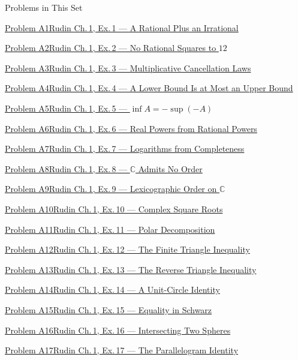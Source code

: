 \documentclass[main.tex]{subfiles}
\begin{document}
\hypertarget{hw-1}{}

\begin{lecturecontents}{Problems in This Set}
  \item \hyperlink{prob:A1}{Problem A1\quad Rudin Ch.\,1, Ex.\,1 --- A Rational Plus an Irrational}
  \item \hyperlink{prob:A2}{Problem A2\quad Rudin Ch.\,1, Ex.\,2 --- No Rational Squares to $12$}
  \item \hyperlink{prob:A3}{Problem A3\quad Rudin Ch.\,1, Ex.\,3 --- Multiplicative Cancellation Laws}
  \item \hyperlink{prob:A4}{Problem A4\quad Rudin Ch.\,1, Ex.\,4 --- A Lower Bound Is at Most an Upper Bound}
  \item \hyperlink{prob:A5}{Problem A5\quad Rudin Ch.\,1, Ex.\,5 --- $\inf A=-\sup(-A)$}
  \item \hyperlink{prob:A6}{Problem A6\quad Rudin Ch.\,1, Ex.\,6 --- Real Powers from Rational Powers}
  \item \hyperlink{prob:A7}{Problem A7\quad Rudin Ch.\,1, Ex.\,7 --- Logarithms from Completeness}
  \item \hyperlink{prob:A8}{Problem A8\quad Rudin Ch.\,1, Ex.\,8 --- $\mathbb C$ Admits No Order}
  \item \hyperlink{prob:A9}{Problem A9\quad Rudin Ch.\,1, Ex.\,9 --- Lexicographic Order on $\mathbb C$}
  \item \hyperlink{prob:A10}{Problem A10\quad Rudin Ch.\,1, Ex.\,10 --- Complex Square Roots}
  \item \hyperlink{prob:A11}{Problem A11\quad Rudin Ch.\,1, Ex.\,11 --- Polar Decomposition}
  \item \hyperlink{prob:A12}{Problem A12\quad Rudin Ch.\,1, Ex.\,12 --- The Finite Triangle Inequality}
  \item \hyperlink{prob:A13}{Problem A13\quad Rudin Ch.\,1, Ex.\,13 --- The Reverse Triangle Inequality}
  \item \hyperlink{prob:A14}{Problem A14\quad Rudin Ch.\,1, Ex.\,14 --- A Unit-Circle Identity}
  \item \hyperlink{prob:A15}{Problem A15\quad Rudin Ch.\,1, Ex.\,15 --- Equality in Schwarz}
  \item \hyperlink{prob:A16}{Problem A16\quad Rudin Ch.\,1, Ex.\,16 --- Intersecting Two Spheres}
  \item \hyperlink{prob:A17}{Problem A17\quad Rudin Ch.\,1, Ex.\,17 --- The Parallelogram Identity}

\end{lecturecontents}
\end{document}
